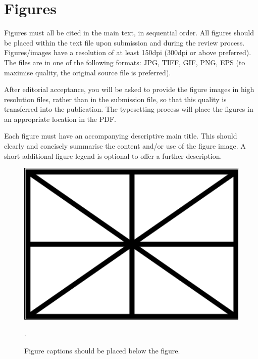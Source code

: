 \section{Figures}\label{sec:figures}

Figures must all be cited in the main text, in sequential order. 
All figures should be placed within the text file upon submission and during
the review process. Figures/images have a resolution of at least 150dpi 
(300dpi or above preferred). The files are in one of the following formats:
JPG, TIFF, GIF, PNG, EPS (to maximise quality,
the original source file is preferred).

After editorial acceptance, you will be asked to provide the figure 
images in high resolution files, rather than in the submission file, 
so that this quality is transferred into the publication.
The typesetting process will place the figures in an appropriate 
location in the PDF.

Each figure must have an accompanying descriptive main title.
This should clearly and concisely summarise the content and/or
use of the figure image.
A short additional figure legend is optional to offer a further description.

\begin{figure}[htbp]
  \centering
\includegraphics[width=0.9\columnwidth]{aux/figs/figure}

\caption{Figure captions should be placed below the figure.}.
\label{fig:figure} 
\end{figure}
